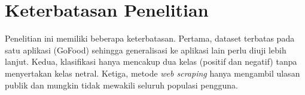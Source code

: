 \section{Keterbatasan Penelitian}

Penelitian ini memiliki beberapa keterbatasan. Pertama, dataset terbatas pada satu aplikasi (GoFood) sehingga generalisasi ke aplikasi lain perlu diuji lebih lanjut. Kedua, klasifikasi hanya mencakup dua kelas (positif dan negatif) tanpa menyertakan kelas netral. Ketiga, metode \emph{web scraping} hanya mengambil ulasan publik dan mungkin tidak mewakili seluruh populasi pengguna.
